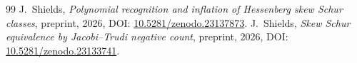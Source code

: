 \documentclass[11pt,a4paper]{amsart}
\numberwithin{equation}{section}
\theoremstyle{plain}
\theoremstyle{definition}
\begin{document}
\begin{thebibliography}{99}
J.~Shields,
\emph{Polynomial recognition and inflation of Hessenberg skew Schur classes},
preprint, 2026,
DOI: \href{https://doi.org/10.5281/zenodo.23137873}{10.5281/\allowbreak zenodo.23137873}.
J.~Shields,
\emph{Skew Schur equivalence by Jacobi--Trudi negative count},
preprint, 2026,
DOI: \href{https://doi.org/10.5281/zenodo.23133741}{10.5281/\allowbreak zenodo.23133741}.
\end{thebibliography}
\end{document}
